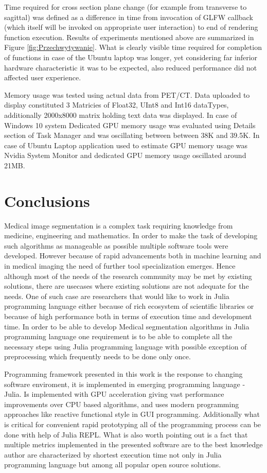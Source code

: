 \documentclass{juliacon}
\begin{document}
Time required for cross section plane change (for example from transverse to sagittal) was defined as a difference in time from invocation of GLFW callback (which itself will be invoked on appropriate user interaction) to end of rendering function execution.
Results of experiments mentioned above are summarized in Figure \ref{fig:Przechwytywanie}. What is clearly visible time required for completion of functions in case of the Ubuntu laptop was longer, yet considering far inferior hardware characteristic it was to be expected, also reduced performance did not affected user experience.


Memory usage was tested using actual data from PET/CT. Data uploaded to display constituted 3 Matricies of Float32, UInt8  and Int16 dataTypes, additionally 2000x8000 matrix holding text data was displayed. 
In case of Windows 10 system Dedicated GPU memory usage was evaluated using Details section of Task Manager and was oscillating between between 38K and 39.5K. In case of Ubuntu Laptop application used to estimate GPU memory usage was Nvidia System Monitor and dedicated GPU memory usage oscillated around 21MB. 

\section{Conclusions}
Medical image segmentation is a complex task requiring knowledge from medicine, engineering and mathematics. In order to make the task of developing such algorithms as manageable as possible multiple software tools were developed. However because of rapid advancements both in machine learning and in medical imaging the need of further tool specialization emerges. Hence although most of the needs of the research community may be met by existing solutions, there are usecases where existing solutions are not adequate for the needs. One of such case are researchers that would like to work in Julia programming language either because of rich ecosystem of scientific libraries or because of high performance both in terms of execution time and development time. In order to be able to develop Medical segmentation algorithms in  Julia programming language one requirement is to be able to complete all the necessary steps using Julia programming language with possible exception of preprocessing which frequently needs to be done only once.

Programming framework presented in this work is the response to changing software enviroment, it is implemented in emerging programming language - Julia. Is implemented with GPU acceleration giving vast performance improvements over CPU based algorithms, and uses modern programming approaches like reactive functional style in GUI programming. Additionally what is critical for convenient rapid prototyping all of the programming process can be done with help of Julia REPL. What is also worth pointing out is a fact that multiple metrics implemented in the presented software are to the best knowledge author are characterized by shortest execution time not only in Julia programming language but among all popular open source solutions. 
\end{document}
